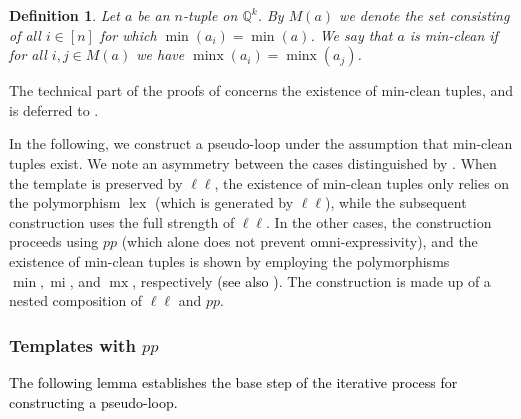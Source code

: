 \documentclass[a4paper,reqno, cleveref]{amsart}
\newcommand{\coloneqq}{\mathrel{\mathop:}\mathrel{\mkern-1.2mu}=}
\newtheorem{definition}[theorem]{Definition}
\newcommand{\Q}{\mathbb{Q}}
\newcommand{\br}[1]{[#1]}
\DeclareMathOperator{\pr}{pr}
\DeclareMathOperator{\mx}{mx}
\DeclareMathOperator{\mi}{mi}
\DeclareMathOperator{\lex}{lex}
\DeclareMathOperator{\minx}{minx}
\newcommand{\pp}[1]{pp_{#1}}
\newcommand{\llp}[1]{{\ell \ell}_{#1}}
\newcommand{\nested}[2]{{#1^{[#2]}}}
\newcommand\jo[1]{\textcolor{black}{#1}} %
\begin{document}
{\begin{definition} Let $a$ be an $n$-tuple on $\Q^k$. By $M(a)$ 
we denote the set consisting of all $i \in \br n$ for which $\min(a_i)=\min(a)$.  We say that $a$ is \emph{min-clean} if for all $i,j \in M(a)$ we have $\minx(a_i)=\minx(a_j)$.
\end{definition}


The technical part of the proofs of  concerns the existence of min-clean tuples, and is deferred to .} In the following, we construct a pseudo-loop  under the assumption that min-clean tuples exist. We note an asymmetry between the cases distinguished by . When the template is preserved by $\ell\ell$, the existence of min-clean tuples only relies on the polymorphism $\lex$ (which is generated by $\ell\ell$), while the subsequent construction uses the full strength of $\ell\ell$. In the other cases, the construction proceeds using $pp$ (which alone does not prevent omni-expressivity), and the existence of min-clean tuples is shown by employing the polymorphisms $\min, \mi$, and $\mx$, respectively \jo{(see also )}.  
%
The construction is made up of a nested composition of $\ell \ell$ and $pp$. %
%


\subsubsection{Templates with \texorpdfstring{$pp$}{pp}}

\jo{The following lemma establishes the base step of the iterative process for constructing a pseudo-loop. }
\end{document}
